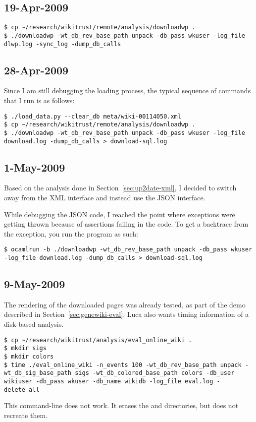 \subsection{19-Apr-2009}

\begin{verbatim}
$ cp ~/research/wikitrust/remote/analysis/downloadwp .
$ ./downloadwp -wt_db_rev_base_path unpack -db_pass wkuser -log_file dlwp.log -sync_log -dump_db_calls
\end{verbatim}

\subsection{28-Apr-2009}

Since I am still debugging the loading process, the typical sequence
of commands that I run is as follows:
\begin{verbatim}
$ ./load_data.py --clear_db meta/wiki-00114050.xml
$ cp ~/research/wikitrust/remote/analysis/downloadwp .
$ ./downloadwp -wt_db_rev_base_path unpack -db_pass wkuser -log_file download.log -dump_db_calls > download-sql.log
\end{verbatim}

\subsection{1-May-2009}

Based on the analysis done in Section~\ref{sec:up2date-xml},
I decided to switch away from the XML interface and
instead use the JSON interface.

While debugging the JSON code, I reached the point where exceptions
were getting thrown because of assertions failing in the code.
To get a backtrace from the exception, you run the program as such:
\begin{verbatim}
$ ocamlrun -b ./downloadwp -wt_db_rev_base_path unpack -db_pass wkuser -log_file download.log -dump_db_calls > download-sql.log
\end{verbatim}

\subsection{9-May-2009}

The rendering of the downloaded pages was already tested,
as part of the demo described in Section~\ref{sec:genewiki-eval}.
Luca also wants timing information of a disk-based analysis.
\begin{verbatim}
$ cp ~/research/wikitrust/analysis/eval_online_wiki .
$ mkdir sigs
$ mkdir colors
$ time ./eval_online_wiki -n_events 100 -wt_db_rev_base_path unpack -wt_db_sig_base_path sigs -wt_db_colored_base_path colors -db_user wikiuser -db_pass wkuser -db_name wikidb -log_file eval.log -delete_all
\end{verbatim}
This command-line does not work.
It erases the  and  directories, but does
not recreate them.

